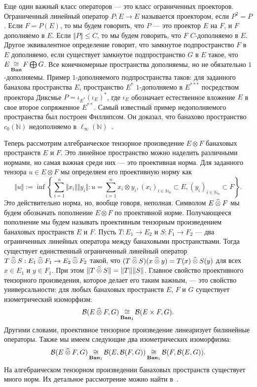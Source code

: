 Еще один важный класс операторов --- это класс ограниченных проекторов.
Ограниченный линейный оператор  $P:E\to E$ называется проектором, если $P^2=P$.
Если $F=P(E)$, то мы будем говорить, что $P$ --- это проектор $E$ на $F$, и $F$
дополняемо в $E$. Если $\Vert P\Vert\leq C$, то мы будем говорить, что $F$
$C$-дополняемо в $E$. Другое эквивалентное определение говорит, что замкнутое
подпространство $F$ в $E$ дополняемо, если существует замкнутое подпространство
$G$ в $E$ такое, что $E\mathop{\mathbin{\cong}}\limits_{\mathbf{Ban}}F\bigoplus G$. Все конечномерные
пространства дополняемы, но не обязательно $1$-дополняемы. Пример
$1$-дополняемого подпространства таков: для заданного банахова пространства $E$,
пространство $E^*$ $1$-дополняемо в $E^{***}$ посредством проектора Диксмье
$P={\iota_{E^*}(\iota_E)}^*$, где $\iota_E$ обозначает естественное вложение $E$
в свое второе сопряженное $E^{**}$. Самый известный пример недополняемого
пространства был построен Филлипсом. Он доказал, что банахово пространство
$c_0(\mathbb{N})$ недополняемо в
$\mathbb{\ell_\infty}(\mathbb{N})$~\cite{PhilOnLinTransfrm}.

Теперь рассмотрим алгебраическое тензорное произведение $E\otimes F$ банаховых
пространств $E$ и $F$. Это линейное пространство можно наделить различными
нормами, но самая важная среди них --- это проективная норма. Для заданного
тензора $u\in E\otimes F$ мы определяем его проективную норму как
$$
\Vert u\Vert
:=\inf\left \{
    \sum_{i=1}^n \Vert x_i\Vert\Vert y_i\Vert
    :u=\sum_{i=1}^n x_i\otimes y_i, 
    {(x_i)}_{i\in\mathbb{N}_n}\subset E, 
    {(y_i)}_{i\in\mathbb{N}_n}\subset F
\right \}.
$$
Это действительно норма, но, вообще говоря, неполная. Символом $E\mathbin{\widehat{\otimes}} F$ мы
будем обозначать пополнение $E\otimes F$ по проективной норме. Получающееся
пополнение мы будем называть проективным тензорным произведением банаховых
пространств $E$ и $F$. Пусть $T:E_1\to E_2$ и $S:F_1\to F_2$ --- два
ограниченных линейных оператора между банаховыми пространствами. Тогда
существует единственный ограниченный линейный оператор $T\mathbin{\widehat{\otimes}}
S:E_1\mathbin{\widehat{\otimes}} F_1\to E_2\mathbin{\widehat{\otimes}} F_2$ такой, что $(T\mathbin{\widehat{\otimes}} S)(x\mathbin{\widehat{\otimes}}
y)=T(x)\mathbin{\widehat{\otimes}} S(y)$ для всех $x\in E_1$ и $y\in F_1$. При этом $\Vert
T\mathbin{\widehat{\otimes}} S\Vert=\Vert T\Vert\Vert S\Vert$. Главное свойство проективного
тензорного произведения, которое делает его таким важным, --- это свойство
универсальности: для любых банаховых пространств $E$, $F$ и $G$ существует
изометрический изоморфизм:
$$
\mathcal{B}(E\mathbin{\widehat{\otimes}} F,G)\mathop{\mathbin{\cong}}\limits_{\mathbf{Ban}_1}\mathcal{B}(E\times F,G).
$$
Другими словами, проективное тензорное произведение линеаризует билинейные
операторы. Также мы имеем следующие два  изометрических изоморфизма:
$$
\mathcal{B}(E\mathbin{\widehat{\otimes}} F,G)
\mathop{\mathbin{\cong}}\limits_{\mathbf{Ban}_1}\mathcal{B}(E,\mathcal{B}(F,G))
\mathop{\mathbin{\cong}}\limits_{\mathbf{Ban}_1}\mathcal{B}(F,\mathcal{B}(E,G)).
$$
На алгебраическом тензорном произведении банаховых пространств существует много
норм. Их детальное рассмотрение можно найти в~\cite{DiestMetTheoryOfTensProd}.

